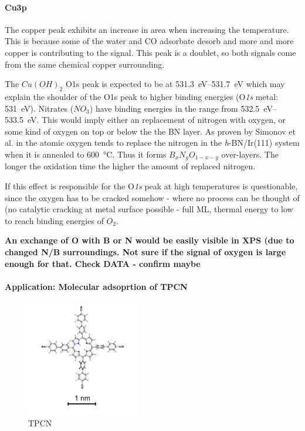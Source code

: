 \paragraph{Cu3p}
The copper peak exhibits an increase in area when increasing the temperature. This is because some of the water and CO adsorbate desorb and more and more copper is contributing to the signal. This peak is a doublet, so both signals come from the same chemical copper surrounding.


The $Cu(OH)_2$ O1s peak is expected to be at \SIrange{531.3}{531.7}{\eV}\cite{deroubaix_x-ray_1992} which may explain the shoulder of the O1s peak to higher binding energies (O\textit{1s} metal: \SI{531}{\eV}). Nitrates ($NO_3$) have binding energies in the range from \SIrange{532.5}{533.5}{\eV}\cite[45]{wanger_handbook_1979}. This would imply either an replacement of nitrogen with oxygen, or some kind of oxygen on top or below the the BN layer. As proven by Simonov et al. in \cite{simonov_controllable_2012} the atomic oxygen tends to replace the nitrogen in the \textit{h}-BN/Ir(111) system when it is annealed to \SI{600}{\degreeCelsius}. Thus it forms $B_{x}N_{y}O_{1-x-y}$ over-layers. The longer the oxidation time the higher the amount of replaced nitrogen. 

If this effect is responsible for the O\textit{1s} peak at high temperatures is questionable, since the oxygen has to be cracked somehow - where no process can be thought of (no catalytic cracking at metal surface possible - full ML, thermal energy to low to reach binding energies of $O_2$.

\textbf{An exchange of O with B or N would be easily visible in XPS (due to changed N/B surroundings. Not sure if the signal of oxygen is large enough for that. Check DATA - confirm maybe}

\paragraph{Application: Molecular adsoprtion of TPCN}

\begin{figure}\centering
	\includegraphics[width=5cm]{./images/molecules/TPCN-scalebar}
	\caption{TPCN}
	\label{fig:TPCN-scalebar}
\end{figure}

